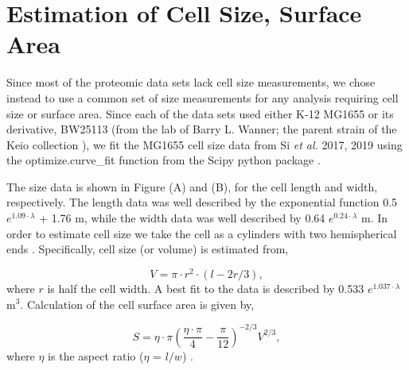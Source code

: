 \section{Estimation of Cell Size, Surface Area}
\label{sec:protein_size_SV}
Since most of the proteomic data sets lack cell size
measurements, we chose instead to use a common set of size measurements for any
analysis requiring cell size or surface area.  Since each of the data sets used
either K-12 MG1655 or its derivative, BW25113 (from the lab of Barry L. Wanner;
the parent strain of the Keio collection \citep{datsenko2000, baba2006}), we fit
the MG1655 cell size data from Si \textit{et al.} 2017, 2019 using
the optimize.curve\_fit function from the Scipy python package \citep{2020scipynmeth}.

The size data is shown in Figure (A)
and (B),  for the cell length and width, respectively. The length data was well
described by the exponential function 0.5 $e^{1.09 \cdot \lambda}$ + 1.76
\textmu m, while the width data was well described by 0.64 $e^{0.24 \cdot \lambda}$
\textmu m. In order to estimate cell size we take the cell as a cylinders
with two hemispherical ends \citep{si2017, basan2015}. Specifically,  cell size
(or volume) is estimated from,

\begin{equation}
V = \pi \cdot r^2 \cdot (l - 2r/3),
\label{eq:cell_size}
\end{equation}
where $r$ is half the cell width. A best fit to the data is described by 0.533
$e^{1.037 \cdot \lambda}$ \textmu m$^3$. Calculation of the cell surface area is
given by,

\begin{equation}
 S = \eta \cdot \pi (\frac{\eta \cdot \pi}{4} - \frac{\pi}{12})^{-2/3} V^{2/3},
 \label{eq:surface_area}
\end{equation}
where $\eta$ is the aspect ratio ($\eta$ = $l/w$) \citep{ojkic2019}.

